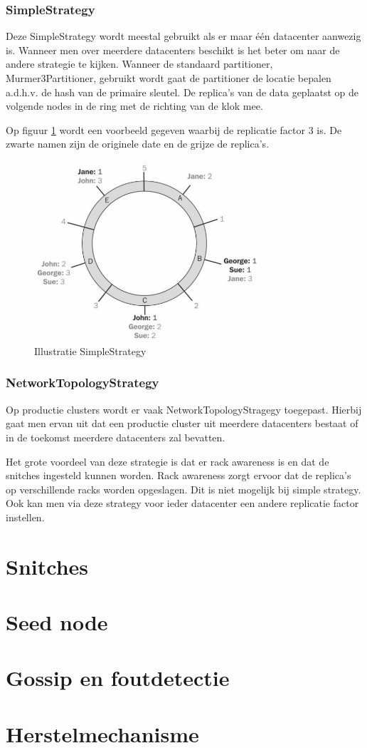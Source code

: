 \subsubsection{SimpleStrategy}
Deze SimpleStrategy wordt meestal gebruikt als er maar één datacenter aanwezig is.
Wanneer men over meerdere datacenters beschikt is het beter om naar de andere strategie te kijken.
Wanneer de standaard partitioner, Murmer3Partitioner, gebruikt wordt gaat de partitioner de locatie bepalen a.d.h.v. de hash van de primaire sleutel.
De replica's van de data geplaatst op de volgende nodes in de ring met de richting van de klok mee.
	
Op figuur \ref{fig:simple_strategy} wordt een voorbeeld gegeven waarbij de replicatie factor 3 is.
De zwarte namen zijn de originele date en de grijze de replica's.
	
\begin{figure}[H]
	\centering
	\includegraphics[width=0.75\textwidth]{img/4_architectuur/SimpleStrategy}
	\caption{Illustratie SimpleStrategy \citep{strickland2014availability}}
	\label{fig:simple_strategy}
\end{figure}
	
	
\subsubsection{NetworkTopologyStrategy}
Op productie clusters wordt er vaak NetworkTopologyStragegy toegepast.
Hierbij gaat men ervan uit dat een productie cluster uit meerdere datacenters bestaat of in de toekomst meerdere datacenters zal bevatten.

Het grote voordeel van deze strategie is dat er rack awareness is en dat de snitches ingesteld kunnen worden.
Rack awareness zorgt ervoor dat de replica's op verschillende racks worden opgeslagen.
Dit is niet mogelijk bij simple strategy.
Ook kan men via deze strategy voor ieder datacenter een andere replicatie factor instellen.

\section{Snitches}
\section{Seed node}
\section{Gossip en foutdetectie}
\section{Herstelmechanisme}
